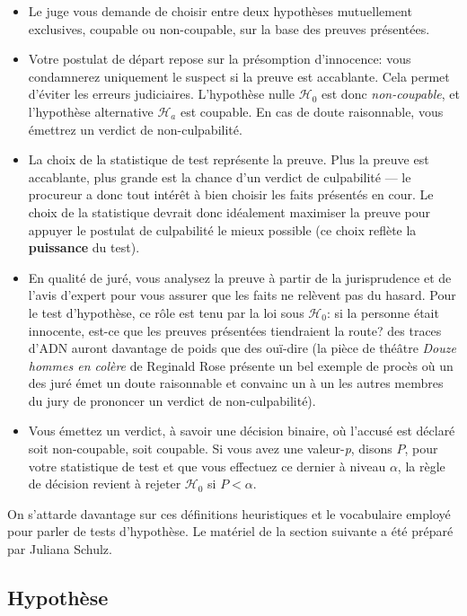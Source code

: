 \documentclass[
  11pt,
  letterpaper,
]{book}
\providecommand{\tightlist}{%
  \setlength{\itemsep}{0pt}\setlength{\parskip}{0pt}}
\theoremstyle{definition}
\theoremstyle{definition}
\theoremstyle{definition}
\theoremstyle{remark}
\begin{document}
\begin{itemize}
\tightlist
\item
  Le juge vous demande de choisir entre deux hypothèses mutuellement exclusives, coupable ou non-coupable, sur la base des preuves présentées.
\item
  Votre postulat de départ repose sur la présomption d'innocence: vous condamnerez uniquement le suspect si la preuve est accablante. Cela permet d'éviter les erreurs judiciaires. L'hypothèse nulle \(\mathscr{H}_0\) est donc \emph{non-coupable}, et l'hypothèse alternative \(\mathscr{H}_a\) est coupable. En cas de doute raisonnable, vous émettrez un verdict de non-culpabilité.
\item
  La choix de la statistique de test représente la preuve. Plus la preuve est accablante, plus grande est la chance d'un verdict de culpabilité --- le procureur a donc tout intérêt à bien choisir les faits présentés en cour. Le choix de la statistique devrait donc idéalement maximiser la preuve pour appuyer le postulat de culpabilité le mieux possible (ce choix reflète la \textbf{puissance} du test).
\item
  En qualité de juré, vous analysez la preuve à partir de la jurisprudence et de l'avis d'expert pour vous assurer que les faits ne relèvent pas du hasard. Pour le test d'hypothèse, ce rôle est tenu par la loi sous \(\mathscr{H}_0\): si la personne était innocente, est-ce que les preuves présentées tiendraient la route? des traces d'ADN auront davantage de poids que des ouï-dire (la pièce de théâtre \emph{Douze hommes en colère} de Reginald Rose présente un bel exemple de procès où un des juré émet un doute raisonnable et convainc un à un les autres membres du jury de prononcer un verdict de non-culpabilité).
\item
  Vous émettez un verdict, à savoir une décision binaire, où l'accusé est déclaré soit non-coupable, soit coupable. Si vous avez une valeur-\emph{p}, disons \(P\), pour votre statistique de test et que vous effectuez ce dernier à niveau \(\alpha\), la règle de décision revient à rejeter \(\mathscr{H}_0\) si \(P < \alpha\).
\end{itemize}

On s'attarde davantage sur ces définitions heuristiques et le vocabulaire employé pour parler de tests d'hypothèse. Le matériel de la section suivante a été préparé par Juliana Schulz.

\hypertarget{hypothuxe8se}{%
\subsection{Hypothèse}\label{hypothuxe8se}}
\end{document}

